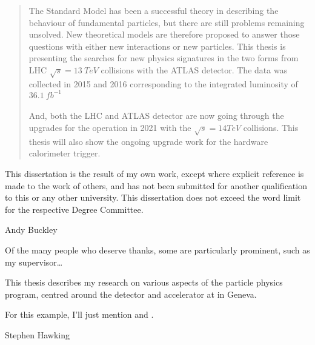 
\begin{abstract}%
The Standard Model has been a successful theory in describing the behaviour of fundamental particles, but there are still problems remaining unsolved. New theoretical models are therefore proposed to answer those questions with either new interactions or new particles. This thesis is presenting the searches for new physics signatures in the two forms from LHC $\sqrt{s}=13~TeV$ collisions with the ATLAS detector. The data was collected in 2015 and 2016 corresponding to the integrated luminosity of $36.1~fb^{-1}$
\\
\\And, both the LHC and ATLAS detector are now going through the upgrades for the operation in 2021 with the $\sqrt{s}=14TeV$ collisions. This thesis will also show the ongoing upgrade work for the hardware calorimeter trigger.    
\end{abstract}


\begin{declaration}
  This dissertation is the result of my own work, except where explicit
  reference is made to the work of others, and has not been submitted
  for another qualification to this or any other university. This
  dissertation does not exceed the word limit for the respective Degree
  Committee.
  \vspace*{1cm}
  \begin{flushright}
    Andy Buckley
  \end{flushright}
\end{declaration}


\begin{acknowledgements}
  Of the many people who deserve thanks, some are particularly prominent,
  such as my supervisor\dots
\end{acknowledgements}


\begin{preface}
  This thesis describes my research on various aspects of the \LHCb
  particle physics program, centred around the \LHCb detector and \LHC
  accelerator at \CERN in Geneva.

  \noindent
  For this example, I'll just mention 
  and .
\end{preface}

\tableofcontents


%
  {Stephen Hawking}
\thispagestyle{empty}
